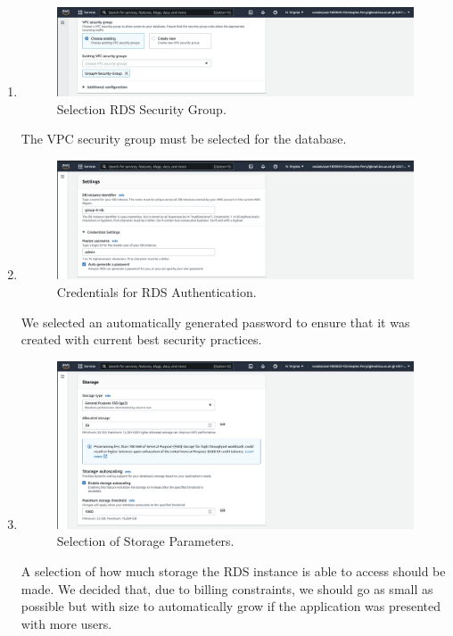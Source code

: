 \begin{enumerate}
    \item
    \begin{figure}[H]
        \centering
        \includegraphics[width=\textwidth]{resources/rds/rds-security-group}
        \caption{Selection RDS Security Group.}
        \label{fig:rds-security}
    \end{figure}\nolinebreak
    The VPC security group must be selected for the database.

    \item
    \begin{figure}[H]
        \centering
        \includegraphics[width=\textwidth]{resources/rds/rds-settings}
        \caption{Credentials for RDS Authentication.}
        \label{fig:rds-settings}
    \end{figure}\nolinebreak
    \nolinebreak
    We selected an automatically generated password to ensure that it was created with current best security practices.

    \item
    \begin{figure}[H]
        \centering
        \includegraphics[width=\textwidth]{resources/rds/rds-storage}
        \caption{Selection of Storage Parameters.}
        \label{fig:rds-storage}
    \end{figure}\nolinebreak
    \nolinebreak
    A selection of how much storage the RDS instance is able to access should be made.
    We decided that, due to billing constraints, we should go as small as possible but with size to automatically grow if
    the application was presented with more users.


\end{enumerate}
